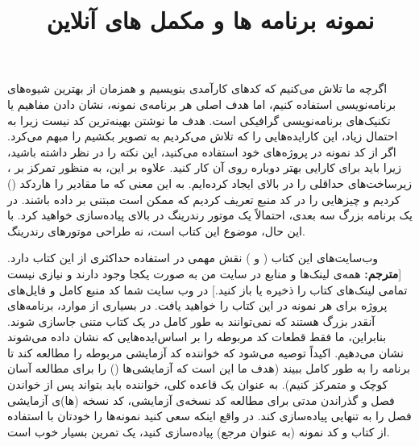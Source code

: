 {
    \Large
    \begin{spacing}{1.5}
        اگرچه ما تلاش می‌کنیم که کد‌های کارآمدی بنویسیم و همزمان از بهترین شیوه‌های برنامه‌نویسی  استفاده کنیم، اما هدف اصلی هر برنامه‌ی نمونه، نشان دادن مفاهیم  یا تکنیک‌های برنامه‌نویسی گرافیکی است.
        هدف ما نوشتن بهینه‌ترین کد نیست زیرا به احتمال زیاد، این کار‌ایده‌هایی را که تلاش می‌کردیم به تصویر بکشیم را مبهم می‌کرد.
        اگر از کد نمونه در پروژه‌های خود استفاده می‌کنید، این نکته را در نظر داشته باشید، زیرا باید برای کارایی بهتر دوباره روی آن کار کنید.
        علاوه بر این، به منظور تمرکز بر ، زیرساخت‌های حداقلی را در بالای  ایجاد کرده‌ایم. به این معنی که ما مقادیر را هاردکد () کردیم و چیز‌هایی را در کد منبع تعریف کردیم که ممکن است مبتنی بر داده باشند.
        در یک برنامه بزرگ سه بعدی، احتمالاً یک موتور رندرینگ در بالای  پیاده‌سازی خواهید کرد. با این حال، موضوع این کتاب  است، نه طراحی موتور‌های رندرینگ.
    \end{spacing}
}
\textbf{\vspace{10pt}}

\title{
    \huge
    \hspace{-40pt}
    \textbf{نمونه برنامه ها و مکمل های آنلاین}
}  \rullFillWithLine[0.5em]{1pt}
\textbf{\vspace{7pt}}

{
    \Large
    \begin{spacing}{1.5}
        وب‌سایت‌های این کتاب (\href{www.d3dcoder.net}{} و \href{www.merclearning.com}{}) نقش مهمی در استفاده حداکثری از این کتاب دارد. [\textbf{مترجم:} همه‌ی لینک‌ها و منابع در سایت من به صورت یکجا وجود دارند و نیازی نیست تمامی لینک‌های کتاب را ذخیره یا باز کنید.]
        در وب سایت شما کد منبع کامل و فایل‌های پروژه برای هر نمونه در این کتاب را خواهید یافت.
        در بسیاری از موارد، برنامه‌های  آنقدر بزرگ هستند که نمی‌توانند به طور کامل در یک کتاب متنی جاسازی شوند. بنابراین، ما فقط قطعات کد مربوطه را بر اساس‌ایده‌هایی که نشان داده می‌شوند نشان می‌دهیم.
        اکیداً توصیه می‌شود که خواننده کد آزمایشی مربوطه را مطالعه کند تا برنامه را به طور کامل ببیند (هدف ما این است که آزمایشی‌ها () را برای مطالعه آسان کوچک و متمرکز کنیم). به عنوان یک قاعده کلی، خواننده باید بتواند پس از خواندن فصل و گذراندن مدتی برای مطالعه کد نسخه‌ی آزمایشی، کد نسخه (ها)ی آزمایشی فصل را به تنهایی پیاده‌سازی کند.
        در واقع اینکه سعی کنید نمونه‌ها را خودتان با استفاده از کتاب و کد نمونه (به عنوان مرجع) پیاده‌سازی کنید، یک تمرین بسیار خوب است.
    \end{spacing}
}
\textbf{\vspace{10pt}}

